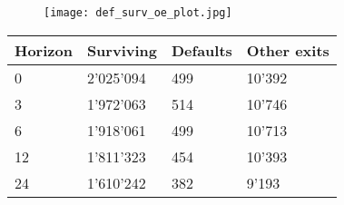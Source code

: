 \begin{figure}[H]
    \centering
    \texttt{[image: def\_surv\_oe\_plot.jpg]}
    \label{fig:defsurv}
\end{figure}

\begin{table}[]
    \centering
    \begin{tabular}{l l l l}
    \hline\hline
Horizon & Surviving & Defaults & Other exits \\
    \hline
0 &  2'025'094 & 499 & 10'392\\
3 &  1'972'063 & 514 & 10'746\\
6 &  1'918'061 & 499 & 10'713\\
12 &  1'811'323 & 454 & 10'393\\
24 &  1'610'242 & 382 & 9'193\\

\end{tabular}
\end{table}
